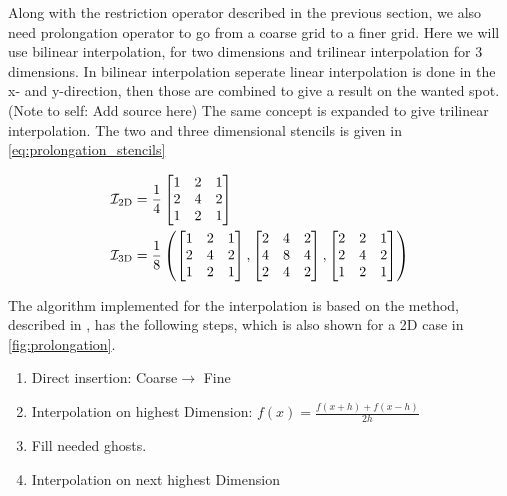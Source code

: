 	Along with the restriction operator described in the previous section, we also need prolongation
	operator to go from a coarse grid to a finer grid.	Here we will use bilinear interpolation, for
	two dimensions and trilinear interpolation for 3 dimensions. In bilinear interpolation seperate
	linear interpolation is done in the x- and y-direction, then those are combined to give a result
	on the wanted spot. (Note to self: Add source here) The same concept is expanded to give trilinear
	interpolation. The two and three dimensional stencils is given in \eqref{eq:prolongation_stencils}


	\begin{equation}
		\centering
		\begin{aligned}
			\mathcal{I}_{2\text{D}} &= \frac{1}{4}
			\begin{bmatrix}
				1 & 2 & 1
				\\
				2 & 4 & 2
				\\
				1 & 2 & 1
			\end{bmatrix}
			\\
			\mathcal{I}_{3\text{D}} &= \frac{1}{8} \left(
			\begin{bmatrix}
				1 & 2 & 1
				\\
				2 & 4 & 2
				\\
				1 & 2 & 1
			\end{bmatrix}
			,
			\begin{bmatrix}
				2 & 4 & 2
				\\
				4 & 8 & 4
				\\
				2 & 4 & 2
			\end{bmatrix}
			,
			\begin{bmatrix}
				2 & 2 & 1
				\\
				2 & 4 & 2
				\\
				1 & 2 & 1
			\end{bmatrix}
			\right)
			\label{eq:prolongation_stencils}
		\end{aligned}
	\end{equation}

	The algorithm implemented for the interpolation is based on the method, described in
	\cite{??}, has the following steps, which is also shown for a 2D case in \ref{fig:prolongation}.

 	\begin{enumerate}
		\item Direct insertion: Coarse$\rightarrow$ Fine
		\item Interpolation on highest Dimension: \(f(x) = \frac{f(x+h) + f(x-h)}{2h}\)
		\item Fill needed ghosts.
		\item Interpolation on next highest Dimension
	\end{enumerate}

